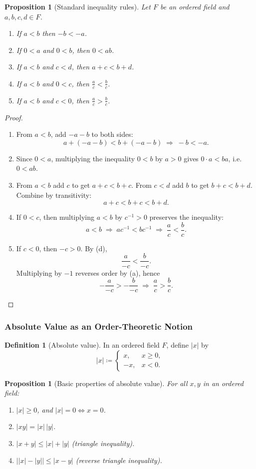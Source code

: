 \documentclass[12pt]{article}
\numberwithin{equation}{section}
\def\abs#1{|#1|}
\DeclarePairedDelimiter{\abs}{\lvert}{\rvert}
\newcommand{\casesm}[1]{\begin{cases}#1\end{cases}}
\theoremstyle{plain}
\newtheorem{proposition}[theorem]{Proposition}
\theoremstyle{definition}
\newtheorem{definition}[theorem]{Definition}
\theoremstyle{remark}
\begin{document}
\begin{proposition}[Standard inequality rules]\label{prop:ineq-rules}
Let $F$ be an ordered field and $a,b,c,d\in F$.
\begin{enumerate}[label=(\alph*)]
\item If $a<b$ then $-b<-a$.
\item If $0<a$ and $0<b$, then $0<ab$.
\item If $a<b$ and $c<d$, then $a+c<b+d$.
\item If $a<b$ and $0<c$, then $\frac{a}{c}<\frac{b}{c}$.
\item If $a<b$ and $c<0$, then $\frac{a}{c}>\frac{b}{c}$.
\end{enumerate}
\end{proposition}

\begin{proof}
\begin{enumerate}[label=(\alph*)]
\item From $a<b$, add $-a-b$ to both sides:
\[
a + (-a-b) < b + (-a-b) \;\Rightarrow\; -b < -a.
\]
\item Since $0<a$, multiplying the inequality $0<b$ by $a>0$ gives $0\cdot a < ba$, i.e.\ $0<ab$.
\item From $a<b$ add $c$ to get $a+c<b+c$. From $c<d$ add $b$ to get $b+c<b+d$. Combine by transitivity:
\[
a+c < b+c < b+d.
\]
\item If $0<c$, then multiplying $a<b$ by $c^{-1}>0$ preserves the inequality:
\[
a<b \;\Rightarrow\; ac^{-1} < bc^{-1} \;\Rightarrow\; \frac{a}{c}<\frac{b}{c}.
\]
\item If $c<0$, then $-c>0$. By (d),
\[
\frac{a}{-c} < \frac{b}{-c}.
\]
Multiplying by $-1$ reverses order by (a), hence
\[
-\frac{a}{-c} > -\frac{b}{-c} \;\Rightarrow\; \frac{a}{c}>\frac{b}{c}.
\]
\end{enumerate}
\end{proof}

\subsubsection{Absolute Value as an Order-Theoretic Notion}

\begin{definition}[Absolute value]
In an ordered field $F$, define $\abs{x}$ by
\[
\abs{x} \coloneqq
\casesm{
x, & x\ge 0,\\
-x, & x<0.
}
\]
\end{definition}

\begin{proposition}[Basic properties of absolute value]\label{prop:abs-basic}
For all $x,y$ in an ordered field:
\begin{enumerate}[label=(\alph*)]
\item $\abs{x}\ge 0$, and $\abs{x}=0 \iff x=0$.
\item $\abs{xy}=\abs{x}\,\abs{y}$.
\item $\abs{x+y}\le \abs{x}+\abs{y}$ (triangle inequality).
\item $\bigl|\abs{x}-\abs{y}\bigr|\le \abs{x-y}$ (reverse triangle inequality).
\end{enumerate}
\end{proposition}
\end{document}
